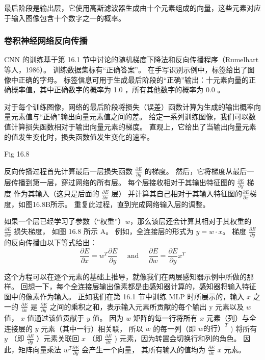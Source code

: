 最后阶段是输出层，它使用高斯滤波器生成由十个元素组成的向量，这些元素对应于输入图像包含十个数字之一的概率。

\subsubsection{卷积神经网络反向传播}
CNN 的训练基于第 16.1 节中讨论的随机梯度下降法和反向传播程序（Rumelhart 等人，1986）。 训练数据集标有“正确答案”。 
在手写识别示例中，标签给出了图像中正确的字母。 
标签信息可用于生成最后阶段的“正确”输出：十元素向量的正确概率值，其中正确数字的概率为 1.0 ，所有其他数字的概率为 0.0 。

对于每个训练图像，网络的最后阶段将损失（误差）函数计算为生成的输出概率向量元素值与“正确”输出向量元素值之间的差。 
给定一系列训练图像，我们可以数值计算损失函数相对于输出向量元素的梯度。 
直观上，它给出了当输出向量元素的值发生变化时，损失函数值发生变化的速率。

{\color{red} Fig 16.8}

反向传播过程首先计算最后一层损失函数 $\frac{\partial E}{\partial y}$ 的梯度。 
然后，它将梯度从最后一层传播到第一层，穿过网络的所有层。 
每个层接收相对于其输出特征图的 $\frac{\partial E}{\partial y}$ 梯度
作为其输入（这只是后面的 $\frac{\partial E}{\partial x}$ 层）
并计算其自己相对于其输入特征图的$\frac{\partial E}{\partial x}$梯度，如图16.8B所示。 
重复此过程，直到完成网络输入层的调整。

如果一个层已经学习了参数（“权重”）$w$，那么该层还会计算其相对于其权重的 $\frac{\partial E}{\partial w}$ 损失梯度，
如图 16.8 所示 A。 例如，全连接层的形式为 $y=w \cdot x$。 
梯度 $\frac{\partial E}{\partial y}$ 的反向传播由以下等式给出：
$$
\frac{\partial E}{\partial x}=w^{T} \frac{\partial E}{\partial y} \quad \text { and } \quad \frac{\partial E}{\partial w}=\frac{\partial E}{\partial y} x^{T}
$$

这个方程可以在逐个元素的基础上推导，就像我们在两层感知器示例中所做的那样。 
回想一下，每个全连接层输出像素都是由感知器计算的，感知器将输入特征图中的像素作为输入。 
正如我们在第 16.1 节中训练 MLP 时所展示的，输入 $x$ 之一的 $\frac{\partial E}{\partial x}$ 
是 $\frac{\partial E}{\partial y}$ 之间的乘积之和，表示输入元素所贡献的每个输出 $\mathrm{y}$ 元素以及 $w$ 值，
$x$ 值通过该值贡献于 $y$ 值。 因为 $w$ 矩阵的每一行将所有 $x$ 元素（列）与全连接层的 $y$ 元素（其中一行）相关联，
所以 $w$ 的每一列（即 $w 的行） ^{T}$ ) 将所有 $y$ （即 $\frac{\partial E}{\partial y}$ ）元素关联回 $x$ （即 $\frac{\partial E}{\partial x}$ ) 元素，因为转置会切换行和列的角色。 
因此，矩阵向量乘法 $w^{T} \frac{\partial E}{\partial y}$ 会产生一个向量，
其所有输入的值均为 $\frac{\partial E}{\partial x}$ $x$ 元素。

